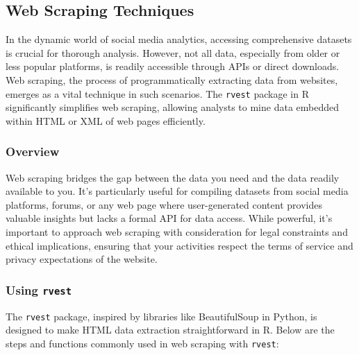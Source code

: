 \documentclass[
]{book}
\begin{document}
\hypertarget{web-scraping-techniques-1}{%
\subsection{Web Scraping Techniques}\label{web-scraping-techniques-1}}

In the dynamic world of social media analytics, accessing comprehensive datasets is crucial for thorough analysis. However, not all data, especially from older or less popular platforms, is readily accessible through APIs or direct downloads. Web scraping, the process of programmatically extracting data from websites, emerges as a vital technique in such scenarios. The \texttt{rvest} package in R significantly simplifies web scraping, allowing analysts to mine data embedded within HTML or XML of web pages efficiently.

\hypertarget{overview-12}{%
\subsubsection{Overview}\label{overview-12}}

Web scraping bridges the gap between the data you need and the data readily available to you. It's particularly useful for compiling datasets from social media platforms, forums, or any web page where user-generated content provides valuable insights but lacks a formal API for data access. While powerful, it's important to approach web scraping with consideration for legal constraints and ethical implications, ensuring that your activities respect the terms of service and privacy expectations of the website.

\hypertarget{using-rvest}{%
\subsubsection{\texorpdfstring{Using \texttt{rvest}}{Using rvest}}\label{using-rvest}}

The \texttt{rvest} package, inspired by libraries like BeautifulSoup in Python, is designed to make HTML data extraction straightforward in R. Below are the steps and functions commonly used in web scraping with \texttt{rvest}:
\end{document}

